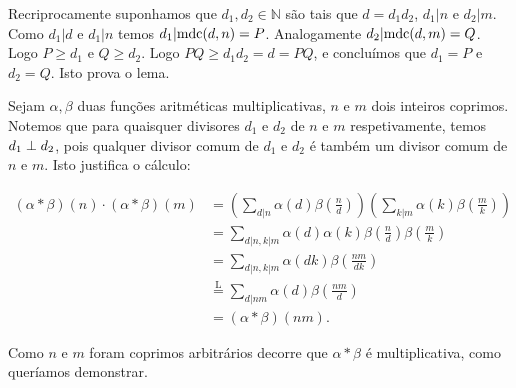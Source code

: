 \documentclass[repertorio-solutions-1.tex]{subfiles}
\renewcommand*{\=}[1]{\ensuremath{\stackrel{\text{#1}}{=}}}
\begin{document}
\begin{solution}
\begin{lemma}
\begin{quickproof}
Recriprocamente suponhamos que $d_1,d_2\in\mathbb{N}$ são tais que $d=d_1d_2$,
$d_1|n$ e $d_2|m$. Como $d_1|d$ e $d_1|n$ temos $d_1|\text{mdc}(d,n)=P$.
Analogamente $d_2|\text{mdc}(d,m)=Q$.
Logo $P\geq d_1$ e $Q\geq d_2$.
Logo $PQ\geq d_1d_2=d=PQ$, e concluímos que $d_1=P$ e $d_2=Q$. Isto prova o lema.
\end{quickproof}
\end{lemma}

Sejam $\alpha,\beta$ duas funções aritméticas multiplicativas, $n$ e $m$ dois inteiros coprimos.
Notemos que para quaisquer divisores $d_1$ e $d_2$ de $n$ e $m$ respetivamente,
temos $d_1\perp d_2$, pois qualquer divisor comum de $d_1$ e $d_2$
é também um divisor comum de $n$ e $m$. Isto justifica o cálculo:

\begin{align*}
(\alpha*\beta)(n)\cdot(\alpha*\beta)(m)
&=\left(\sum_{d|n}\alpha(d)\beta(\frac{n}{d})\right)
\left(\sum_{k|m}\alpha(k)\beta(\frac{m}{k})\right) \\
&=\sum_{d|n,k|m}\alpha(d)\alpha(k)\beta(\frac{n}{d})\beta(\frac{m}{k}) \\
&=\sum_{d|n,k|m}\alpha(dk)\beta(\frac{nm}{dk}) \\
&\={L}\sum_{d|nm}\alpha(d)\beta(\frac{nm}{d}) \\
&=(\alpha*\beta)(nm).
\end{align*}

Como $n$ e $m$ foram coprimos arbitrários decorre que $\alpha*\beta$
é multiplicativa, como queríamos demonstrar.
\end{solution}
\end{document}
